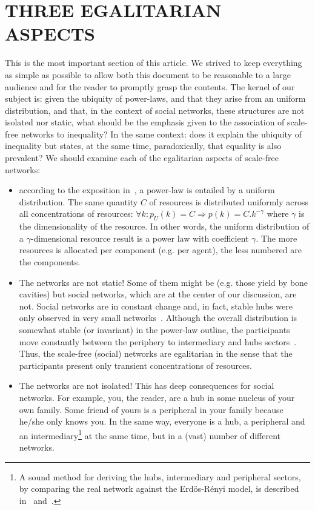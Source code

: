 \documentclass[12pt,fleqn]{article}
\begin{document}
\section{THREE EGALITARIAN ASPECTS}\label{sec:three}
This is the most important section of this article.
We strived to keep everything as simple as possible to allow
both this document to be reasonable to a large audience
and for the reader to promptly grasp the contents.
The kernel of our subject is: given the ubiquity of power-laws,
and that they arise from an uniform distribution,
and that, in the context of social networks, these structures
are not isolated nor static,
what should be the emphasis given to the association of scale-free
networks to inequality?
In the same context: does it explain the ubiquity of inequality
but states, at the same time, paradoxically, that equality is also prevalent?
We should examine each of the egalitarian aspects of scale-free networks:
\begin{itemize}
	\item according to the exposition in~\cite{fabbri3}, 
		a power-law is entailed by a uniform distribution.
		The same quantity $C$ of resources
		is distributed uniformly across all concentrations of resources:
		$\forall k : p_U(k)=C \Rightarrow p(k) = C.k^{-\gamma}$
		where $\gamma$ is the dimensionality of the resource.
                In other words, the uniform distribution of a $\gamma$-dimensional
		resource result is a power law with coefficient $\gamma$.
		The more resources is allocated per component (e.g. per agent), the less numbered
		are the components.
	\item The networks are not static!
		Some of them might be (e.g. those yield by bone cavities)
		but social networks, which are at the center of our discussion, are not.
		Social networks are in constant change and, in fact, stable hubs were only observed
		in very small networks~\citep{barabasi}.
		Although the overall distribution is somewhat stable (or invariant) in the power-law outline,
		the participants move constantly between the periphery to intermediary and hubs sectors~\citep{fabbri1,fabbri2,versinus}.
		Thus, the scale-free (social) networks are egalitarian in the sense that
		the participants present only transient concentrations of resources.
	\item The networks are not isolated!
		This has deep consequences for social networks.
		For example, you, the reader, are a hub in some nucleus of your own family.
		Some friend of yours is a peripheral in your family because he/she only knows you.
		In the same way, everyone is a hub, a peripheral and an intermediary\footnote{A
		sound method for deriving the hubs, intermediary and peripheral sectors,
		by comparing the real network against the Erdös-Rényi model, is described
		in~\cite{fabbri1} and~\cite{fabbri2}.} at the same time,
		but in a (vast) number of different networks.
\end{itemize}
\end{document}
